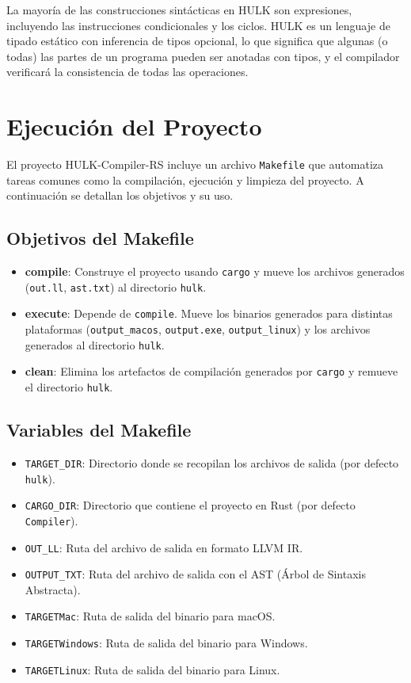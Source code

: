 \documentclass[a4paper, 12pt]{article}
\begin{document}
La mayoría de las construcciones sintácticas en HULK son expresiones, incluyendo las instrucciones condicionales y los ciclos. HULK es un lenguaje de tipado estático con inferencia de tipos opcional, lo que significa que algunas (o todas) las partes de un programa pueden ser anotadas con tipos, y el compilador verificará la consistencia de todas las operaciones.

\section{Ejecución del Proyecto}

El proyecto HULK-Compiler-RS incluye un archivo \texttt{Makefile} que automatiza tareas comunes como la compilación, ejecución y limpieza del proyecto. A continuación se detallan los objetivos y su uso.

\subsection{Objetivos del Makefile}

\begin{itemize}
  \item \textbf{compile}: Construye el proyecto usando \texttt{cargo} y mueve los archivos generados (\texttt{out.ll}, \texttt{ast.txt}) al directorio \texttt{hulk}.
  \item \textbf{execute}: Depende de \texttt{compile}. Mueve los binarios generados para distintas plataformas (\texttt{output\_macos}, \texttt{output.exe}, \texttt{output\_linux}) y los archivos generados al directorio \texttt{hulk}.
  \item \textbf{clean}: Elimina los artefactos de compilación generados por \texttt{cargo} y remueve el directorio \texttt{hulk}.
\end{itemize}

\subsection{Variables del Makefile}

\begin{itemize}
  \item \texttt{TARGET\_DIR}: Directorio donde se recopilan los archivos de salida (por defecto \texttt{hulk}).
  \item \texttt{CARGO\_DIR}: Directorio que contiene el proyecto en Rust (por defecto \texttt{Compiler}).
  \item \texttt{OUT\_LL}: Ruta del archivo de salida en formato LLVM IR.
  \item \texttt{OUTPUT\_TXT}: Ruta del archivo de salida con el AST (Árbol de Sintaxis Abstracta).
  \item \texttt{TARGETMac}: Ruta de salida del binario para macOS.
  \item \texttt{TARGETWindows}: Ruta de salida del binario para Windows.
  \item \texttt{TARGETLinux}: Ruta de salida del binario para Linux.
\end{itemize}
\end{document}
